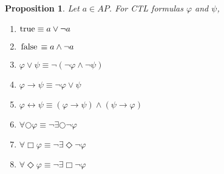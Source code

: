 \documentclass[12pt]{article}
\newcommand{\always}{\Box}
\newcommand{\eventually}{\Diamond}
\newcommand{\nxt}{\bigcirc}
\newcommand{\TRUE}{\mbox{\lstinline{true}}}
\newcommand{\FALSE}{\mbox{\lstinline{false}}}
\newtheorem{proposition}{Proposition}
\theoremstyle{definition}
\begin{document}
\begin{proposition}
Let $a \in \mathit{AP}$.  For CTL formulas $\varphi$ and $\psi$, 
\begin{enumerate}
\item 
$\TRUE \equiv a \vee \neg a$
\item 
$\FALSE \equiv a \wedge \neg a$
\item
$\varphi \vee \psi \equiv \neg(\neg \varphi \wedge \neg \psi)$
\item
$\varphi \rightarrow \psi \equiv \neg \varphi \vee \psi$
\item
$\varphi \leftrightarrow \psi \equiv (\varphi \rightarrow \psi) \wedge (\psi \rightarrow \varphi)$
\item
$\forall \nxt \varphi \equiv \neg \exists \nxt \neg \varphi$
\item
$\forall \always \varphi \equiv \neg \exists \eventually \neg \varphi$
\item
$\forall \eventually \varphi \equiv \neg \exists \always \neg \varphi$
\end{enumerate}
\end{proposition}
\end{document}
